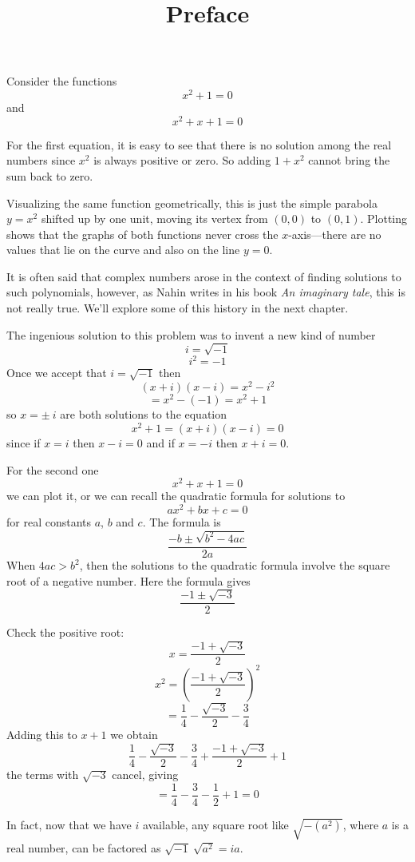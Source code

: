 \documentclass[11pt, oneside]{article}
\title{Preface}
\date{}
\begin{document}
\maketitle
\Large


Consider the functions
\[ x^2 + 1 = 0 \]
and
\[ x^2 + x + 1 = 0 \]

For the first equation, it is easy to see that there is no solution among the real numbers since $x^2$ is always positive or zero.  So adding $1 + x^2$ cannot bring the sum back to zero.

Visualizing the same function geometrically, this is just the simple parabola $y=x^2$ shifted up by one unit, moving its vertex from $(0,0)$ to $(0,1)$.  Plotting shows that the graphs of both functions never cross the $x$-axis---there are no values that lie on the curve and also on the line $y=0$.

It is often said that complex numbers arose in the context of finding solutions to such polynomials, however, as Nahin writes in his book \emph{An imaginary tale}, this is not really true.  We'll explore some of this history in the next chapter.

The ingenious solution to this problem was to invent a new kind of number
\[ i = \sqrt{-1} \]
\[ i^2 = -1 \]
Once we accept that $i = \sqrt{-1}$
then
\[ (x + i)(x - i) = x^2 - i^2 \]
\[ = x^2 - (-1) = x^2 + 1 \]
so $x = \pm \ i$ are both solutions to the equation 
\[ x^2 + 1 = (x + i)(x - i) = 0 \]
since if $x = i$ then $x - i = 0$ and if $x = -i$ then $x + i = 0$.

For the second one
\[ x^2 + x + 1 = 0 \]
we can plot it, or we can recall the quadratic formula for solutions to
\[ ax^2 + bx + c = 0 \]
for real constants $a$, $b$ and $c$.  The formula is
\[ \frac{-b \pm \sqrt{b^2 - 4ac}}{2a} \]
When $4ac > b^2$, then the solutions to the quadratic formula involve the square root of a negative number.  Here the formula gives
\[ \frac{-1 \pm \sqrt{-3}}{2} \]

Check the positive root:
\[ x = \frac{-1 + \sqrt{-3}}{2} \]
\[ x^2 = (\frac{-1 + \sqrt{-3}}{2})^2 \]
\[ = \frac{1}{4} - \frac{\sqrt{-3}}{2} - \frac{3}{4} \]
Adding this to $x+1$ we obtain
\[  \frac{1}{4} - \frac{\sqrt{-3}}{2} - \frac{3}{4}  + \frac{-1 + \sqrt{-3}}{2} + 1 \]
the terms with $\sqrt{-3}$ cancel, giving
\[ = \frac{1}{4} - \frac{3}{4}  - \frac{1}{2} + 1 = 0 \]

In fact, now that we have $i$ available, any square root like $\sqrt{-(a^2)}$, where $a$ is a real number, can be factored as $\sqrt{-1} \ \sqrt{a^2} = ia$.
\end{document}
